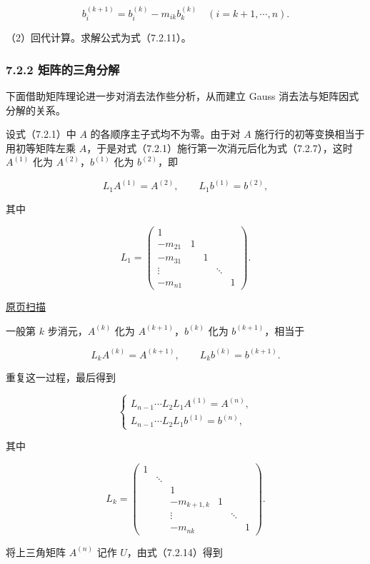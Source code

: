 \documentclass[
  10pt,
  fontset=fandol]{ctexart}
\begin{document}
\[b_i^{(k+1)}=b_i^{(k)}-m_{ik}b_k^{(k)}\quad(i=k+1,\cdots,n).\]

（2）回代计算。求解公式为式（7.2.11）。

\subsubsection{7.2.2 矩阵的三角分解}\label{ux77e9ux9635ux7684ux4e09ux89d2ux5206ux89e3}

下面借助矩阵理论进一步对消去法作些分析，从而建立 Gauss 消去法与矩阵因式分解的关系。

设式（7.2.1）中 \(A\) 的各顺序主子式均不为零。由于对 \(A\) 施行行的初等变换相当于用初等矩阵左乘 \(A\)，于是对式（7.2.1）施行第一次消元后化为式（7.2.7），这时 \(A^{(1)}\) 化为 \(A^{(2)}\)，\(b^{(1)}\) 化为 \(b^{(2)}\)，即

\[L_1A^{(1)}=A^{(2)},\qquad L_1b^{(1)}=b^{(2)},\]

其中

\[
L_1=\begin{pmatrix}
1&&&&\\
-m_{21}&1&&&\\
-m_{31}&&1&&\\
\vdots&&&\ddots&\\
-m_{n1}&&&&1
\end{pmatrix}.
\]

\href{../../source-images/pdf-182.jpeg}{原页扫描}

一般第 \(k\) 步消元，\(A^{(k)}\) 化为 \(A^{(k+1)}\)，\(b^{(k)}\) 化为 \(b^{(k+1)}\)，相当于

\[L_kA^{(k)}=A^{(k+1)},\qquad L_kb^{(k)}=b^{(k+1)}.\]

重复这一过程，最后得到

\[
\begin{cases}
L_{n-1}\cdots L_2L_1A^{(1)}=A^{(n)},\\
L_{n-1}\cdots L_2L_1b^{(1)}=b^{(n)},
\end{cases}
\tag{7.2.14}
\]

其中

\[
L_k=\begin{pmatrix}
1&&&&&\\
&\ddots&&&&\\
&&1&&&\\
&&-m_{k+1,k}&1&&\\
&&\vdots&&\ddots&\\
&&-m_{nk}&&&1
\end{pmatrix}.
\]

将上三角矩阵 \(A^{(n)}\) 记作 \(U\)，由式（7.2.14）得到
\end{document}
